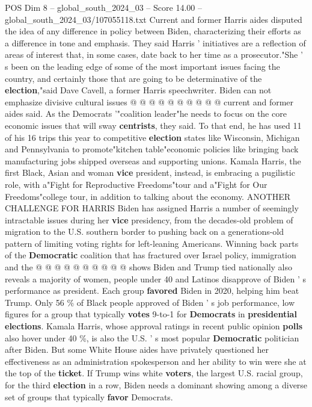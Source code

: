 \begin{textsample}{POS Dim 8 – global\_south\_2024\_03 – Score 14.00 – global\_south\_2024\_03/107055118.txt}
Current and former Harris aides disputed the idea of any difference in policy between Biden, characterizing their efforts as a difference in tone and emphasis.
They said Harris ' initiatives are a reflection of areas of interest that, in some cases, date back to her time as a prosecutor."She ' s been on the leading edge of some of the most important issues facing the country, and certainly those that are going to be determinative of the \textbf{election},"said Dave Cavell, a former Harris speechwriter.
Biden can not emphasize divisive cultural issues @ @ @ @ @ @ @ @ @ @ current and former aides said.
As the Democrats '"coalition leader"he needs to focus on the core economic issues that will sway \textbf{centrists}, they said.
To that end, he has used 11 of his 16 trips this year to competitive \textbf{election} states like Wisconsin, Michigan and Pennsylvania to promote"kitchen table"economic policies like bringing back manufacturing jobs shipped overseas and supporting unions.
Kamala Harris, the first Black, Asian and woman \textbf{vice} president, instead, is embracing a pugilistic role, with a"Fight for Reproductive Freedoms"tour and a"Fight for Our Freedoms"college tour, in addition to talking about the economy.
ANOTHER CHALLENGE FOR HARRIS Biden has assigned Harris a number of seemingly intractable issues during her \textbf{vice} presidency, from the decades-old problem of migration to the U.S. southern border to pushing back on a generations-old pattern of limiting voting rights for left-leaning Americans.
Winning back parts of the \textbf{Democratic} coalition that has fractured over Israel policy, immigration and the @ @ @ @ @ @ @ @ @ @ shows Biden and Trump tied nationally also reveals a majority of women, people under 40 and Latinos disapprove of Biden ' s performance as president.
Each group \textbf{favored} Biden in 2020, helping him beat Trump.
Only 56 \% of Black people approved of Biden ' s job performance, low figures for a group that typically \textbf{votes} 9-to-1 for \textbf{Democrats} in \textbf{presidential} \textbf{elections}.
Kamala Harris, whose approval ratings in recent public opinion \textbf{polls} also hover under 40 \%, is also the U.S. ' s most popular \textbf{Democratic} politician after Biden.
But some White House aides have privately questioned her effectiveness as an administration spokesperson and her ability to win were she at the top of the \textbf{ticket}.
If Trump wins white \textbf{voters}, the largest U.S. racial group, for the third \textbf{election} in a row, Biden needs a dominant showing among a diverse set of groups that typically \textbf{favor} Democrats.

\end{textsample}
